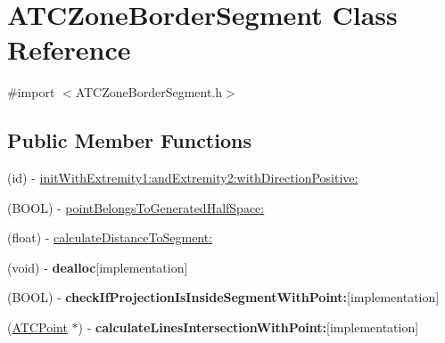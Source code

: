 \hypertarget{class_a_t_c_zone_border_segment}{
\section{\-A\-T\-C\-Zone\-Border\-Segment \-Class \-Reference}
\label{class_a_t_c_zone_border_segment}
}


{\ttfamily \#import $<$\-A\-T\-C\-Zone\-Border\-Segment.\-h$>$}

\subsection*{\-Public \-Member \-Functions}
\begin{DoxyCompactItemize}
\item 
(id) -\/ \hyperlink{class_a_t_c_zone_border_segment_a6f0d9be3a9ea9cde7b24075629b93613}{init\-With\-Extremity1\-:and\-Extremity2\-:with\-Direction\-Positive\-:}
\item 
(\-B\-O\-O\-L) -\/ \hyperlink{class_a_t_c_zone_border_segment_a6ff901b513d84a61d1b508de90d51d3e}{point\-Belongs\-To\-Generated\-Half\-Space\-:}
\item 
(float) -\/ \hyperlink{class_a_t_c_zone_border_segment_a4bc8f6402aaaee12d903857c2c72f0c4}{calculate\-Distance\-To\-Segment\-:}
\item 
\hypertarget{class_a_t_c_zone_border_segment_a9b150de986c9ec6159d9552ff5ebcee9}{
(void) -\/ {\bfseries dealloc}{\ttfamily  \mbox{[}implementation\mbox{]}}}
\label{class_a_t_c_zone_border_segment_a9b150de986c9ec6159d9552ff5ebcee9}

\item 
\hypertarget{class_a_t_c_zone_border_segment_a2115732eb1d2fe919d9e313b1989d2b5}{
(\-B\-O\-O\-L) -\/ {\bfseries check\-If\-Projection\-Is\-Inside\-Segment\-With\-Point\-:}{\ttfamily  \mbox{[}implementation\mbox{]}}}
\label{class_a_t_c_zone_border_segment_a2115732eb1d2fe919d9e313b1989d2b5}

\item 
\hypertarget{class_a_t_c_zone_border_segment_a6a3f75755b9c968d65f4dce0d32e657d}{
(\hyperlink{interface_a_t_c_point}{\-A\-T\-C\-Point} $\ast$) -\/ {\bfseries calculate\-Lines\-Intersection\-With\-Point\-:}{\ttfamily  \mbox{[}implementation\mbox{]}}}
\label{class_a_t_c_zone_border_segment_a6a3f75755b9c968d65f4dce0d32e657d}

\end{DoxyCompactItemize}
